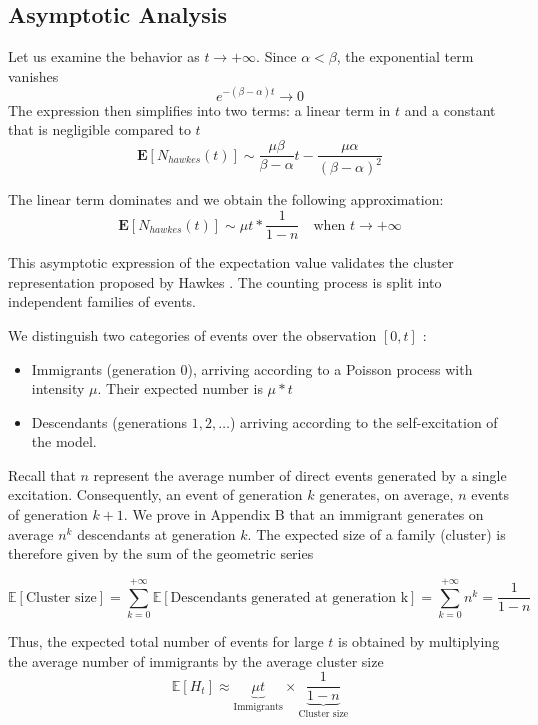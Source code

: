 \documentclass[a4paper,11pt]{article}
\begin{document}
\subsection{Asymptotic Analysis}
Let us examine the behavior as $t \to +\infty$.
 Since $\alpha < \beta$, the exponential term vanishes
$$e^{-(\beta - \alpha) t} \to 0$$
The expression then simplifies into two terms: a linear term in $t$ and a constant that is negligible compared to $t$
$$
\mathbf{E}[N_{hawkes}(t)] \sim \frac{\mu \beta}{\beta - \alpha} t - \frac{\mu \alpha}{(\beta - \alpha)^2}
$$

The linear term dominates and we obtain the following approximation:
$$
\boxed{\mathbf{E}[N_{hawkes}(t)] \sim \mu t*\frac{1 }{1 - n} \quad \text{when } t \to +\infty}
$$

This asymptotic expression of the expectation value validates the cluster representation proposed by Hawkes \cite{hawkes1974}. The counting process is split into independent families of events.

We distinguish two categories of events over the observation $[0, t]$ :
\begin{itemize}
    \item Immigrants (generation 0), arriving according to a Poisson process with intensity $\mu$. Their expected number is $\mu*t$
    \item Descendants (generations $1, 2, \dots$) arriving according to the self-excitation of the model.
\end{itemize}

Recall that $n$ represent the average number of direct events generated by a single excitation. Consequently, an event of generation $k$ generates, on average, $n$ events of generation $k+1$. We prove in Appendix B that an immigrant generates on average $n^k$ descendants at generation $k$. The expected size of a family (cluster) is therefore given by the sum of the geometric series

\begin{equation}
    \mathbb{E}[\text{Cluster size}] =\sum_{k=0}^{+\infty} \mathbb{E}[\text{Descendants generated at generation k}]   = \sum_{k=0}^{+\infty} n^k=\frac{1}{1-n}
\end{equation}

Thus, the expected total number of events for large $t$ is obtained by multiplying the average number of immigrants by the average cluster size
\begin{equation}
    \mathbb{E}[H_t] \approx \underbrace{\mu t}_{\text{Immigrants}} \times \underbrace{\frac{1}{1-n}}_{\text{Cluster size}}
\end{equation}
\end{document}

